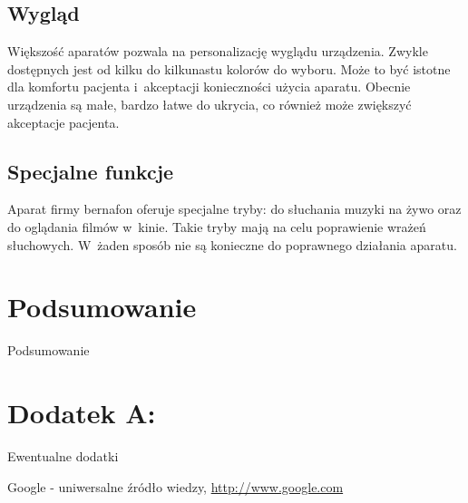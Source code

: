 \documentclass[journal]{IEEEtran}
\begin{document}
\subsection{Wygląd}

Większość aparatów pozwala na personalizację wyglądu urządzenia. Zwykle dostępnych jest od kilku do kilkunastu kolorów do wyboru. Może to być istotne dla komfortu pacjenta i~akceptacji konieczności użycia aparatu. Obecnie urządzenia są małe, bardzo łatwe do ukrycia, co również może zwiększyć akceptacje pacjenta.

\subsection{Specjalne funkcje}

Aparat firmy bernafon oferuje specjalne tryby: do słuchania muzyki na żywo oraz do oglądania filmów w~kinie. Takie tryby mają na celu poprawienie wrażeń słuchowych. W~żaden sposób nie są konieczne do poprawnego działania aparatu. 

\section{Podsumowanie}

Podsumowanie

\section{Dodatek A: }

Ewentualne dodatki


\begin{thebibliography}{123}
    Google - uniwersalne źródło wiedzy,
        \url{http://www.google.com}
\end{thebibliography}
\end{document}
